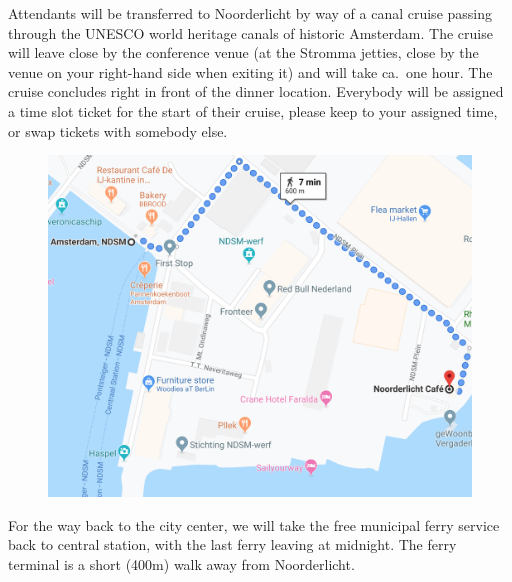 Attendants will be transferred to Noorderlicht by way of a canal cruise passing through the UNESCO world heritage canals of historic Amsterdam. The cruise will leave close by the conference venue (at the Stromma jetties, close by the venue on your right-hand side when exiting it) and will take ca.\ one hour. The cruise concludes right in front of the dinner location. Everybody will be assigned a time slot ticket for the start of their cruise, please keep to your assigned time, or swap tickets with somebody else.

\begin{figure}[h]
\centering
\includegraphics[width=.6\textwidth]{images/noorderlicht-ndsmferry.png}
\end{figure}


For the way back to the city center, we will take the free municipal ferry service back to central station, with the last ferry leaving at midnight. The ferry terminal is a short (400m) walk away from Noorderlicht.
